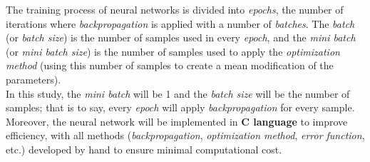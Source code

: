 \documentclass[a4paper, 11pt]{article}
\begin{document}
The training process of neural networks is divided into \textit{epochs}, the number of iterations where \textit{backpropagation} is applied with a number of \textit{batches}. The \textit{batch} (or \textit{batch size}) is the number of samples used in every \textit{epoch}, and the \textit{mini batch} (or \textit{mini batch size}) is the number of samples used to apply the \textit{optimization method} (using this number of samples to create a mean modification of the parameters).\\ 
In this study, the \textit{mini batch} will be 1 and the \textit{batch size} will be the number of samples; that is to say, every \textit{epoch} will apply \textit{backpropagation} for every sample.\\ 
Moreover, the neural network will be implemented in \textbf{C language} to improve efficiency, with all methods (\textit{backpropagation}, \textit{optimization method}, \textit{error function}, etc.) developed by hand to ensure minimal computational cost.

\end{document}
